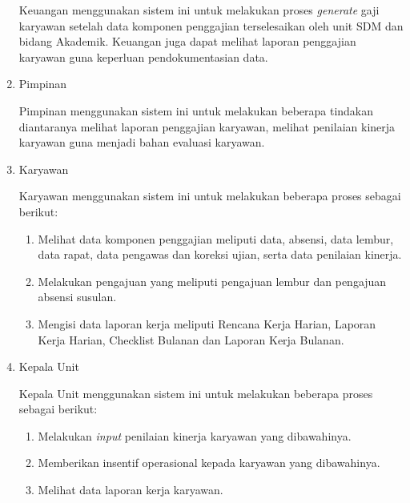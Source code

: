 \begin{enumerate}
						Keuangan menggunakan sistem ini untuk melakukan proses \emph{generate} gaji karyawan setelah data komponen penggajian terselesaikan oleh unit SDM dan bidang Akademik. Keuangan juga dapat melihat laporan penggajian karyawan guna keperluan pendokumentasian data.
					\item Pimpinan
					
						Pimpinan menggunakan sistem ini untuk melakukan beberapa tindakan diantaranya melihat laporan penggajian karyawan, melihat penilaian kinerja karyawan guna menjadi bahan evaluasi karyawan.
					\item Karyawan
					
						Karyawan menggunakan sistem ini untuk melakukan beberapa proses sebagai berikut:
						\begin{enumerate}[label=\alph*.]
							\itemsep0em
							\item Melihat data komponen penggajian meliputi data, absensi, data lembur, data rapat, data pengawas dan koreksi ujian, serta data penilaian kinerja.
							\item Melakukan pengajuan yang meliputi pengajuan lembur dan pengajuan absensi susulan.
							\item Mengisi data laporan kerja meliputi Rencana Kerja Harian, Laporan Kerja Harian, Checklist Bulanan dan Laporan Kerja Bulanan.
						\end{enumerate}
					\item Kepala Unit
					
					    Kepala Unit menggunakan sistem ini untuk melakukan beberapa proses sebagai berikut:
					    \begin{enumerate}[label=\alph*.]
					        \itemsep0em
					        \item Melakukan \emph{input} penilaian kinerja karyawan yang dibawahinya.
					        \item Memberikan insentif operasional kepada karyawan yang dibawahinya.
					        \item Melihat data laporan kerja karyawan.
					    \end{enumerate}
				\end{enumerate}

